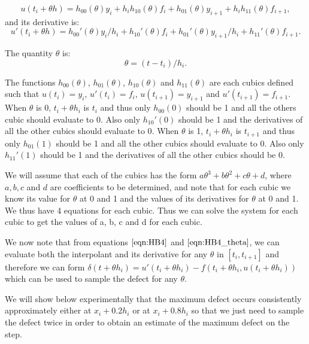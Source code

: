 \begin{equation}
\label{eqn:HB4}
u(t_i + \theta h) = h_{00}(\theta)y_i +  h_ih_{10}(\theta)f_i + h_{01}(\theta)y_{i + 1} + h_ih_{11}(\theta)f_{i + 1}, 
\end{equation}
and its derivative is:
\begin{equation}
u'(t_i + \theta h) = h_{00}'(\theta)y_i/h_i +  h_{10}'(\theta)f_i + h_{01}'(\theta)y_{i + 1}/h_i + h_{11}'(\theta)f_{i + 1}. 
\end{equation}

The quantity $\theta$ is:
\begin{equation}
\label{eqn:HB4_theta}
\theta = (t - t_i) / h_i.
\end{equation}

The functions $h_{00}(\theta)$, $h_{01}(\theta)$, $h_{10}(\theta)$ and $h_{11}(\theta)$ are each cubics defined such that $u(t_i)= y_i$, $u'(t_i) = f_i$, $u(t_{i+1}) = y_{i + 1}$ and $u'(t_{i + 1}) = f_{i + 1}$. When $\theta$ is 0, $t_i + \theta h_i$ is $t_i$ and thus only $h_{00}(0)$ should be 1 and all the others cubic should evaluate to 0. Also only $h_{10}'(0)$ should be 1 and the derivatives of all the other cubics should evaluate to 0. When $\theta$ is 1, $t_i + \theta h_i$ is $t_{i + 1}$ and thus only $h_{01}(1)$ should be 1 and all the other cubics should evaluate to 0. Also only $h_{11}'(1)$ should be 1 and the derivatives of all the other cubics should be 0.

We will assume that each of the cubics has the form $a\theta^3 + b\theta^2 + c\theta + d$, where $a, b, c$ and $d$ are coefficients to be determined, and note that for each cubic we know its value for $\theta$ at 0 and 1 and the values of its derivatives for $\theta$ at 0 and 1. We thus have 4 equations for each cubic. Thus we can solve the system for each cubic to get the values of a, b, c and d for each cubic.

We now note that from equations $\ref{eqn:HB4}$ and $\ref{eqn:HB4_theta}$, we can evaluate both the interpolant and its derivative for any $\theta$ in $[t_i, t_{i + 1}]$ and therefore we can form $\delta(t + \theta h_i) = u'(t_i + \theta h_i) - f(t_i + \theta h_i, u(t_i + \theta h_i))$ which can be used to sample the defect for any $\theta$.

We will show below experimentally that the maximum defect occurs consistently approximately either at $x_i + 0.2h_i$ or at $x_i + 0.8h_i$ so that we just need to sample the defect twice in order to obtain an estimate of the maximum defect on the step.

